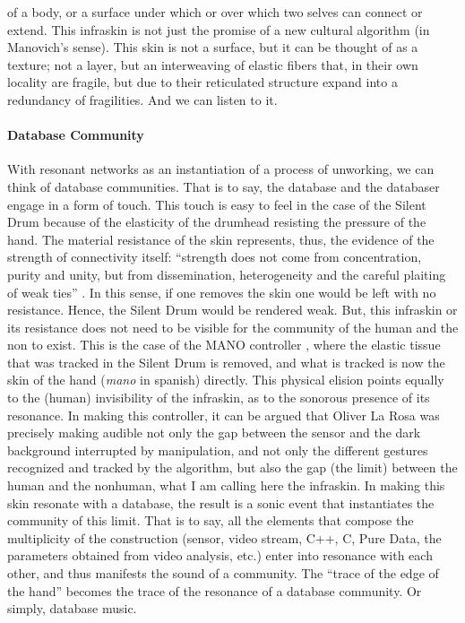 of a body, or a surface under which or over which two selves can connect or extend. This infraskin is not just the promise of a new cultural algorithm (in Manovich's sense). This skin is not a surface, but it can be thought of as a texture; not a layer, but an interweaving of elastic fibers  that, in their own locality are fragile, but due to their reticulated structure expand into a redundancy of fragilities. And we can listen to it.  

\paragraph{Database Community}
With resonant networks as an instantiation of a process of unworking, we can think of database communities. That is to say, the database and the databaser engage in a form of touch. This touch is easy to feel in the case of the Silent Drum because of the elasticity of the drumhead resisting the pressure of the hand. The material resistance of the skin represents, thus, the evidence of the strength of connectivity itself: ``strength does not come from concentration, purity and unity, but from dissemination, heterogeneity and the careful plaiting of weak ties'' \parencite[3]{Lat90:On}. In this sense, if one removes the skin one would be left with no resistance. Hence, the Silent Drum would be rendered weak. But, this infraskin or its resistance does not need to be visible for the community of the human and the non to exist. This is the case of the MANO controller \parencite{DBLP:conf/icmc/OliverJ10}, where the elastic tissue that was tracked in the Silent Drum is removed, and what is tracked is now the skin of the hand (\textit{mano} in spanish) directly. This physical elision points equally to the (human) invisibility of the infraskin, as to the sonorous presence of its resonance. In making this controller, it can be argued that Oliver La Rosa was precisely making audible not only the gap between the sensor and the dark background interrupted by manipulation, and not only the different gestures recognized and tracked by the algorithm, but also the gap (the limit) between the human and the nonhuman, what I am calling here the infraskin. In making this skin resonate with a database, the result is a sonic event that instantiates the community of this limit. That is to say, all the elements that compose the multiplicity of the construction (sensor, video stream, C++, C, Pure Data, the parameters obtained from video analysis, etc.) enter into resonance with each other, and thus manifests the sound of a community. The ``trace of the edge of the hand'' \parencite[2]{DBLP:conf/icmc/OliverJ10} becomes the trace of the resonance of a database community. Or simply, database music.

